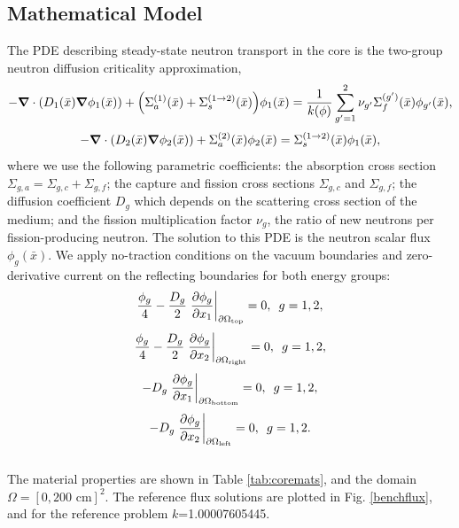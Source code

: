 \documentclass[11pt]{article}
\newcommand{\xs}[2]{\ensuremath{\Sigma_{#1}^{(#2)}}}
\begin{document}
\subsection{Mathematical Model}
The PDE describing steady-state neutron transport in the core is the two-group neutron diffusion criticality approximation,
\begin{equation}
-\grad\cdot\qty( D_1(\bar x)\grad\phi_1(\bar x))+\qty(\xs{a}{1}(\bar x)+\xs{s}{1\to2}(\bar x))\phi_1(\bar x) = \frac{1}{k(\phi)}\sum_{g'=1}^2\nu_{g'}\xs{f}{g'}(\bar x)\phi_{g'}(\bar x),
\end{equation}
\begin{equation}
-\grad \cdot\qty(D_2(\bar x)\grad \phi_2(\bar x))+\xs{a}{2}(\bar x)\phi_2(\bar x) = \xs{s}{1\to 2}(\bar x)\phi_1(\bar x),
\end{equation}
where we use the following parametric coefficients: the absorption cross section $\Sigma_{g,a}=\Sigma_{g,c}+\Sigma_{g,f}$; the capture and fission cross sections $\Sigma_{g,c}$ and $\Sigma_{g,f}$; the diffusion coefficient $D_g$ which depends on the scattering cross section of the medium; and the fission multiplication factor $\nu_g$, the ratio of new neutrons per fission-producing neutron.  The solution to this PDE is the neutron scalar flux $\phi_g(\bar x)$.  We apply no-traction conditions on the vacuum boundaries and zero-derivative current on the reflecting boundaries for both energy groups:
 \begin{equation}
\frac{\phi_g}{4}-\frac{D_g}{2}\eval{\pdv{\phi_g}{x_1}}_{\partial \Omega_\text{top}}=0,\hspace{5pt} g=1,2,
\end{equation}
\begin{equation}
\frac{\phi_g}{4}-\frac{D_g}{2}\eval{\pdv{\phi_g}{x_2}}_{\partial \Omega_\text{right}}=0,\hspace{5pt} g=1,2,
\end{equation}
\begin{equation}
-D_g\eval{\pdv{\phi_g}{x_1}}_{\partial \Omega_\text{bottom}}=0,\hspace{5pt} g=1,2,
\end{equation}
\begin{equation}
-D_g\eval{\pdv{\phi_g}{x_2}}_{\partial \Omega_\text{left}}=0,\hspace{5pt} g=1,2.
\end{equation}
\\

The material properties are shown in Table \ref{tab:coremats}, and the domain $\Omega=[0,200\text{ cm}]^2$.  The reference flux solutions are plotted in Fig. \ref{benchflux}, and for the reference problem $k$=1.00007605445.
\end{document}
